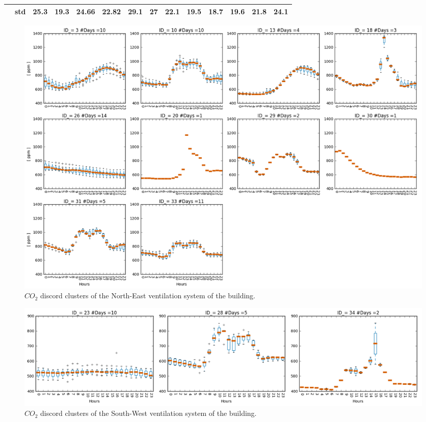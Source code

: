 \begin{table}[htbp]
\begin{tabular}{|c|l|r|r|r|r|r|r|r|r|r|r|r|r|}
\cline{2-14}    \rowcolor[rgb]{ .553,  .706,  .886}      & \textbf{std} & \cellcolor[rgb]{ 1,  1,  1} 25.3 & \cellcolor[rgb]{ 1,  1,  1} 19.3 & \cellcolor[rgb]{ 1,  1,  1} 24.66 & \cellcolor[rgb]{ 1,  1,  1} 22.82 & \cellcolor[rgb]{ 1,  1,  1} 29.1 & \cellcolor[rgb]{ 1,  1,  1} 27 & \cellcolor[rgb]{ 1,  1,  1} 22.1 & \cellcolor[rgb]{ 1,  1,  1} 19.5 & \cellcolor[rgb]{ 1,  1,  1} 18.7 & \cellcolor[rgb]{ 1,  1,  1} 19.6 & \cellcolor[rgb]{ 1,  1,  1} 21.8 & \cellcolor[rgb]{ 1,  1,  1} 24.1 \bigstrut\\
    \hline
    \end{tabular}%
  \label{tab:discord_profiles}%
\end{table}%
    
 
\begin{landscape}
\leavevmode
\newline

\begin{figure}[h!]
  \vspace{0.5em} %
  \includegraphics[scale=0.6]{Figures/discord_candidates_all.jpg}
  \caption{$CO_2$ discord clusters of the North-East ventilation system of the building. }
  \label{fig:discord_candidates_all}
\end{figure}

\begin{figure}[h!]
  \vspace{0.5em} %
  \includegraphics[scale=0.6]{Figures/discord_candidates_all_SW.jpg}
  \caption{$CO_2$ discord clusters of the South-West ventilation system of the building. }
  \label{fig:discord_candidates_all_SW}
\end{figure}

\end{landscape}
\restoregeometry


